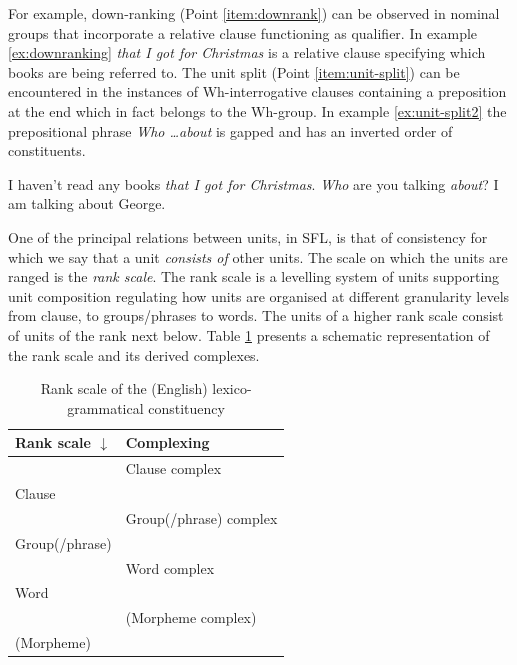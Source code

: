 For example, down-ranking (Point \ref{item:downrank}) can be observed in nominal groups that incorporate a relative clause functioning as qualifier. In example \ref{ex:downranking} \textit{that I got for Christmas} is a relative clause specifying which books are being referred to. The unit split (Point \ref{item:unit-split}) can be encountered in the instances of Wh-interrogative clauses containing a preposition at the end which in fact belongs to the Wh-group. In example \ref{ex:unit-split2} the prepositional phrase \textit{Who \dots about} is gapped and has an inverted order of constituents. 


\begin{exe}
	\ex\label{ex:downranking} I haven't read any books \textit{that I got for Christmas}.
	\ex\label{ex:unit-split2} \textit{Who} are you talking \textit{about}?
	\ex\label{ex:unit-split1} I am talking about George.
\end{exe}

One of the principal relations between units, in SFL, is that of consistency for which we say that a unit \textit{consists of} other units. The scale on which the units are ranged is the \textit{rank scale}. The rank scale is a levelling system of units supporting unit composition regulating how units are organised at different granularity levels from clause, to groups/phrases to words. The units of a higher rank scale consist of units of the rank next below. Table \ref{tab:rank-scale} presents a schematic representation of the rank scale and its derived complexes.

\begin{table}[!ht]
	\centering
	\begin{tabular}{|l|l|}
		\hline
		{\bf Rank scale $\downarrow$} & {\bf Complexing} \\ \hline
		& Clause complex           \\ \hline
		Clause           &                          \\ \hline
		& Group(/phrase) complex   \\ \hline
		Group(/phrase)   &                          \\ \hline
		& Word complex             \\ \hline
		Word             &                          \\ \hline
		& (Morpheme complex)       \\ \hline
		(Morpheme)       &                          \\ \hline
	\end{tabular}
	\caption{Rank scale of the (English) lexico-grammatical constituency}
	\label{tab:rank-scale}
\end{table}

